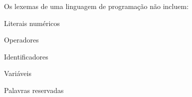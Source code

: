 \question[10]

Os lexemas de uma linguagem de programação não incluem:

\begin{choices}
\item Literais numéricos
\item Operadores
\item Identificadores
\item Variáveis %
\item Palavras reservadas
\end{choices}
\answerline

